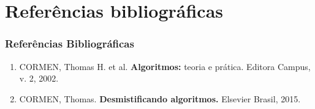 \documentclass[aspectratio=169]{beamer}
\begin{document}
	\section{Refer\^{e}ncias bibliogr\'{a}ficas}
	\begin{frame}
		\frametitle{Refer\^{e}ncias Bibliogr\'{a}ficas}
		\begin{enumerate}
			\item CORMEN, Thomas H. et al.\textbf{ Algoritmos:} teoria e prática. Editora Campus, v. 2, 2002.
			\item CORMEN, Thomas. \textbf{Desmistificando algoritmos.} Elsevier Brasil, 2015.
		\end{enumerate}
	\end{frame}

\end{document}
